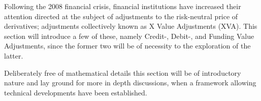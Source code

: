 \documentclass[../../../main.tex]{subfiles}
\begin{document}
    Following the 2008 financial crisis,
    financial institutions have increased their attention directed at the subject of 
    adjustments to the risk-neutral price of derivatives;
    adjustments collectively known as X Value Adjustments (XVA).
    This section will introduce a few of these, 
    namely Credit-, Debit-, and Funding Value Adjustments,
    since the former two will be of necessity to the exploration of the latter.

    Deliberately free of mathematical details this section will be of introductory nature 
    and lay ground for more in depth discussions, 
    when a framework allowing technical developments have been established.
\end{document}
